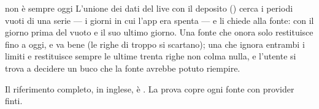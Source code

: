 \begin{attenzione}{ non è sempre oggi}
L'unione dei dati del live con il deposito () cerca i
periodi vuoti di una serie --- i giorni in cui l'app era spenta --- e li
chiede alla fonte:  con  il giorno
prima del vuoto e  il suo ultimo giorno. Una fonte che onora solo
 restituisce fino a oggi, e va bene (le righe di troppo si
scartano); una che ignora entrambi i limiti e restituisce sempre le ultime
trenta righe non colma nulla, e l'utente si trova a decidere un buco che la
fonte avrebbe potuto riempire.
\end{attenzione}

\noindent
Il riferimento completo, in inglese, è . La
prova  copre ogni fonte con provider finti.

